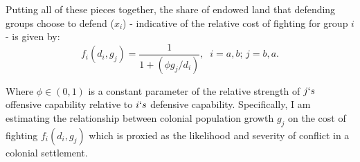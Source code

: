 \documentclass[11pt, oneside]{article}
\begin{document}
Putting all of these pieces together, the share of endowed land that defending groups choose to defend ($x_i$) - indicative of the relative cost of fighting for group $i$ - is given by:
\begin{equation}
f_i(d_i, g_j)=\frac{1}{1+(\phi g_j/d_i)},\; \; i=a,b;\, j=b,a.
\end{equation}

\noindent Where $\phi \in (0,1) $ is a constant parameter of the relative strength of $j`s$ offensive capability relative to $i`s$ defensive capability. Specifically, I am estimating the relationship between colonial population growth $g_{j}$ on the cost of fighting $f_i(d_i, g_j)$ which is proxied as the likelihood and severity of conflict in a colonial settlement.




\end{document}
